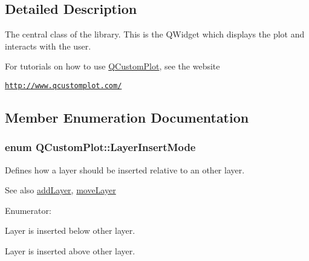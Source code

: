 \subsection{\-Detailed \-Description}
\-The central class of the library. \-This is the \-Q\-Widget which displays the plot and interacts with the user. 

\-For tutorials on how to use \hyperlink{classQCustomPlot}{\-Q\-Custom\-Plot}, see the website\par
 \href{http://www.qcustomplot.com/}{\tt http\-://www.\-qcustomplot.\-com/} 

\subsection{\-Member \-Enumeration \-Documentation}
\hypertarget{classQCustomPlot_a75a8afbe6ef333b1f3d47abb25b9add7}{
\subsubsection[{\-Layer\-Insert\-Mode}]{\setlength{\rightskip}{0pt plus 5cm}enum {\bf \-Q\-Custom\-Plot\-::\-Layer\-Insert\-Mode}}}\label{classQCustomPlot_a75a8afbe6ef333b1f3d47abb25b9add7}
\-Defines how a layer should be inserted relative to an other layer.

\begin{DoxySeeAlso}{\-See also}
\hyperlink{classQCustomPlot_ad5255393df078448bb6ac83fa5db5f52}{add\-Layer}, \hyperlink{classQCustomPlot_ae896140beff19424e9e9e02d6e331104}{move\-Layer} 
\end{DoxySeeAlso}
\begin{Desc}
\item[\-Enumerator\-: ]\par
\begin{description}
\item[{\em 
\hypertarget{classQCustomPlot_a75a8afbe6ef333b1f3d47abb25b9add7aee39cf650cd24e68552da0b697ce4a93}{lim\-Below}\label{classQCustomPlot_a75a8afbe6ef333b1f3d47abb25b9add7aee39cf650cd24e68552da0b697ce4a93}
}]\-Layer is inserted below other layer. \item[{\em 
\hypertarget{classQCustomPlot_a75a8afbe6ef333b1f3d47abb25b9add7a062b0b7825650b432a713c0df6742d41}{lim\-Above}\label{classQCustomPlot_a75a8afbe6ef333b1f3d47abb25b9add7a062b0b7825650b432a713c0df6742d41}
}]\-Layer is inserted above other layer. \end{description}
\end{Desc}


